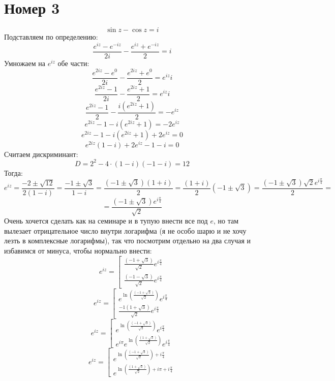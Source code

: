 \documentclass[a4paper,12pt]{article}
\begin{document}
\section*{Номер 3}
\[
\sin z - \cos z = i
\]
Подставляем по определению:
\[
\frac{e^{iz} - e^{-iz}}{2i} - \frac{e^{iz} + e^{-iz}}{2} = i
\]
Умножаем на $e^{iz}$ обе части:
\[
\frac{e^{2iz} - e^{0}}{2i} - \frac{e^{2iz} + e^{0}}{2} = e^{iz}i
\]
\[
\frac{e^{2iz} - 1}{2i} - \frac{e^{2iz} + 1}{2} = e^{iz}i
\]
\[
\frac{e^{2iz} - 1}{2} - \frac{i(e^{2iz} + 1)}{2} = -e^{iz}
\]
\[
e^{2iz} - 1- i(e^{2iz} + 1) = -2e^{iz}
\]
\[
e^{2iz} - 1- i(e^{2iz} + 1)  + 2e^{iz} = 0
\]
\[
e^{2iz}(1 - i) + 2e^{iz} - 1 - i = 0
\]
Считаем дискриминант:
\[
D = 2^2 - 4 \cdot (1 - i) (-1 - i) = 12 
\]
Тогда:
\[
e^{iz} = \frac{-2 \pm  \sqrt{12}}{2(1 - i)} = \frac{-1 \pm \sqrt{3}}{1- i} = \frac{(-1 \pm \sqrt{3})(1 + i)}{2}  =\frac{(1 + i)}{2}(-1 \pm \sqrt{3}) =  \frac{(-1 \pm \sqrt{3})\sqrt{2}e^{i \frac{\pi}{4}}}{2}  =
\]
\[
=
\frac{(-1 \pm \sqrt{3})e^{i \frac{\pi}{4}}}{\sqrt{2}}  
\]
Очень хочется сделать как на семинаре и в тупую внести все под $e$, но там вылезает отрицательное число внутри логарифма (я не особо шарю и не хочу лезть в комплексные логарифмы), так что посмотрим отдельно на два случая и избавимся от минуса, чтобы нормально внести:
\[
e^{iz} = 
\left[ 
      \begin{gathered} 
        \frac{(-1 +  \sqrt{3})}{\sqrt{2}}  e^{i \frac{\pi}{4}}\\
	  \frac{(-1 -  \sqrt{3})}{\sqrt{2}} e^{i \frac{\pi}{4}}
      \end{gathered} 
\right.
\]
\[
e^{iz} = 
\left[ 
      \begin{gathered} 
        e^{\ln \left( \frac{(-1 +  \sqrt{3})}{\sqrt{2}}  \right) } e^{i \frac{\pi}{4}}\\
	  \frac{-1(1 +  \sqrt{3})}{\sqrt{2}} e^{i \frac{\pi}{4}}
      \end{gathered} 
\right.
\]
\[
e^{iz} = 
\left[ 
      \begin{gathered} 
        e^{\ln \left( \frac{(-1 +  \sqrt{3})}{\sqrt{2}}  \right) } e^{i \frac{\pi}{4}}\\
	  e^{i \pi }e^{\ln \left( \frac{(1 +  \sqrt{3})}{\sqrt{2}}\right)}e^{i \frac{\pi}{4}}
      \end{gathered} 
\right.
\]
\[
e^{iz} = 
\left[ 
      \begin{gathered} 
        e^{\ln \left( \frac{(-1 +  \sqrt{3})}{\sqrt{2}}  \right)  + i \frac{\pi}{4}} \\
	  e^{\ln \left( \frac{(1 +  \sqrt{3})}{\sqrt{2}}\right) + i \pi + i \frac{\pi}{4} }
      \end{gathered} 
\right.
\]
\end{document}
